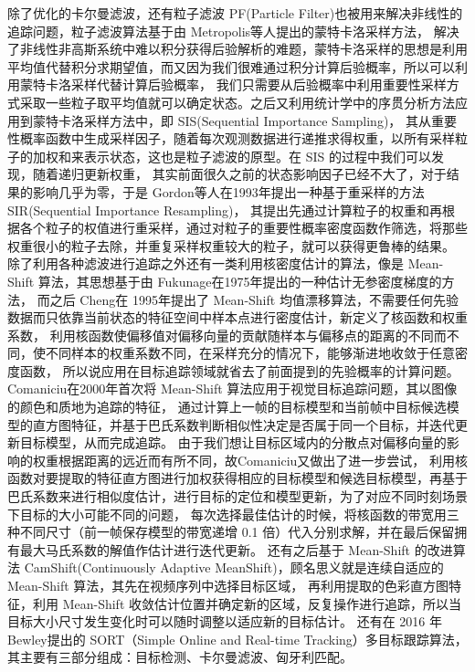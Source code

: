 除了优化的卡尔曼滤波，还有粒子滤波 PF(Particle Filter)\cite{50}也被用来解决非线性的追踪问题，粒子滤波算法基于由 Metropolis等人\cite{51}提出的蒙特卡洛采样方法，
解决了非线性非高斯系统中难以积分获得后验解析的难题，蒙特卡洛采样的思想是利用平均值代替积分求期望值，而又因为我们很难通过积分计算后验概率，所以可以利用蒙特卡洛采样代替计算后验概率，
我们只需要从后验概率中利用重要性采样方式采取一些粒子取平均值就可以确定状态。之后又利用统计学中的序贯分析方法应用到蒙特卡洛采样方法中，即 SIS(Sequential Importance Sampling)\cite{52}，
其从重要性概率函数中生成采样因子，随着每次观测数据进行递推求得权重，以所有采样粒子的加权和来表示状态，这也是粒子滤波的原型。在 SIS 的过程中我们可以发现，随着递归更新权重，
其实前面很久之前的状态影响因子已经不大了，对于结果的影响几乎为零，于是 Gordon等人\cite{53}在1993年提出一种基于重采样的方法 SIR(Sequential Importance Resampling)，
其提出先通过计算粒子的权重和再根据各个粒子的权值进行重采样，通过对粒子的重要性概率密度函数作筛选，将那些权重很小的粒子去除，并重复采样权重较大的粒子，就可以获得更鲁棒的结果。
除了利用各种滤波进行追踪之外还有一类利用核密度估计的算法，像是 Mean-Shift 算法，其思想基于由 Fukunage在1975年提出的一种估计无参密度梯度的方法\cite{54}，
而之后 Cheng在 1995年\cite{55}提出了 Mean-Shift 均值漂移算法，不需要任何先验数据而只依靠当前状态的特征空间中样本点进行密度估计，新定义了核函数和权重系数，
利用核函数使偏移值对偏移向量的贡献随样本与偏移点的距离的不同而不同，使不同样本的权重系数不同，在采样充分的情况下，能够渐进地收敛于任意密度函数，
所以说应用在目标追踪领域就省去了前面提到的先验概率的计算问题。Comaniciu\cite{56}在2000年首次将 Mean-Shift 算法应用于视觉目标追踪问题，其以图像的颜色和质地为追踪的特征，
通过计算上一帧的目标模型和当前帧中目标候选模型的直方图特征，并基于巴氏系数判断相似性决定是否属于同一个目标，并迭代更新目标模型，从而完成追踪。
由于我们想让目标区域内的分散点对偏移向量的影响的权重根据距离的远近而有所不同，故Comaniciu又做出了进一步尝试\cite{57}，
利用核函数对要提取的特征直方图进行加权获得相应的目标模型和候选目标模型，再基于巴氏系数来进行相似度估计，进行目标的定位和模型更新，为了对应不同时刻场景下目标的大小可能不同的问题，
每次选择最佳估计的时候，将核函数的带宽用三种不同尺寸（前一帧保存模型的带宽递增 0.1 倍）代入分别求解，并在最后保留拥有最大马氏系数的解值作估计进行迭代更新。
还有之后基于 Mean-Shift 的改进算法 CamShift(Continuously Adaptive MeanShift)\cite{58}，顾名思义就是连续自适应的 Mean-Shift 算法，其先在视频序列中选择目标区域，
再利用提取的色彩直方图特征，利用 Mean-Shift 收敛估计位置并确定新的区域，反复操作进行追踪，所以当目标大小尺寸发生变化时可以随时调整以适应新的目标估计。
还有在 2016 年 Bewley\cite{59}提出的 SORT（Simple Online and Real-time Tracking）多目标跟踪算法，其主要有三部分组成：目标检测、卡尔曼滤波、匈牙利匹配。
